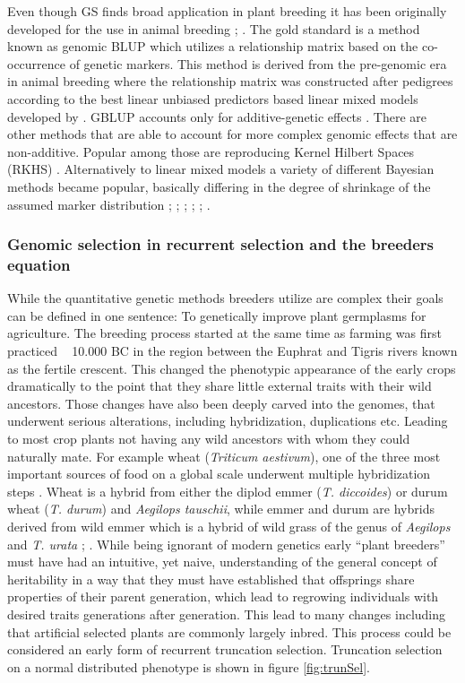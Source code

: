 Even though GS finds broad application in plant breeding it has been originally developed for the use in
animal breeding \cite{hayes2010genome}; \cite{goddard2011using}. The gold standard is a method known as
genomic BLUP \cite{vanraden2008efficient} which utilizes a relationship matrix based on the co-occurrence of
genetic markers. This method is derived from the pre-genomic era in animal breeding where the relationship
matrix was constructed after pedigrees according to the best linear unbiased predictors based linear mixed
models developed by \cite{henderson1975best}. GBLUP accounts only for additive-genetic effects
\cite{vanraden2008efficient}. There are other methods that are able to account for more complex genomic
effects that are non-additive. Popular among those are reproducing Kernel Hilbert Spaces (RKHS)
\cite{gianola2008reproducing}. Alternatively to linear mixed models a variety of different Bayesian methods
became popular, basically differing in the degree of shrinkage of the assumed marker distribution
\cite{hayes2001}; \cite{gianola2009}; \cite{habier2011}; \cite{gianola2013}; \cite{crossa2017};
\cite{azodi2019}.

\subsubsection{Genomic selection in recurrent selection and the breeders equation}

While the quantitative genetic methods breeders utilize are complex their goals can be defined in one
sentence: To genetically improve plant germplasms for agriculture. The breeding process started at the same
time as farming was first practiced ~ 10.000 BC in the region between the Euphrat and Tigris rivers known as
the fertile crescent. This changed the phenotypic appearance of the early crops dramatically to the point that
they share little external traits with their wild ancestors. Those changes have also been deeply carved into
the genomes, that underwent serious alterations, including hybridization, duplications etc. Leading to most
crop plants not having any wild ancestors with whom they could naturally mate. For example wheat
(\textit{Triticum aestivum}), one of the three most important sources of food on a global scale underwent
multiple hybridization steps \cite{ozkan2001allopolyploidy}. Wheat is a hybrid from either the diplod emmer
(\textit{T. diccoides}) or durum wheat (\textit{T. durum}) and \textit{{Aegilops tauschii}}, while emmer and
durum are hybrids derived from wild emmer which is a hybrid of wild grass of the genus of \textit{Aegilops}
and \textit{T. urata} \cite{friebe2000development}; \cite{feldman2012genome}. While being ignorant of modern
genetics early ``plant breeders'' must have had an intuitive, yet naive, understanding of the general concept
of heritability in a way that they must have established that offsprings share properties of their parent
generation, which lead to regrowing individuals with desired traits generations after generation. This lead to
many changes including that artificial selected plants are commonly largely inbred. This process could be
considered an early form of recurrent truncation selection. Truncation selection on a normal distributed
phenotype is shown in figure \ref{fig:trunSel}.
 
